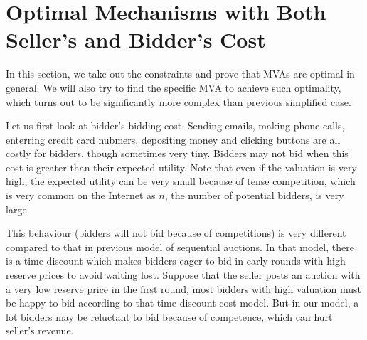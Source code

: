 \section{Optimal Mechanisms with Both Seller's and Bidder's Cost}

In this section, we take out the constraints and prove that MVAs are optimal in
general. We will also try to find the specific MVA to achieve such optimality,
which turns out to be significantly more complex than previous
simplified case.

Let us first look at bidder's bidding cost.  Sending emails, making phone
calls, enterring credit card nubmers, depositing money and clicking buttons are
all costly for bidders, though sometimes very tiny.  Bidders may not bid when
this cost is greater than their expected utility. Note that even if the
valuation is very high, the expected utility can be very small because of tense
competition, which is very common on the Internet as $n$, the number of
potential bidders, is very large.


This behaviour (bidders will not bid because of competitions) is very different
compared to that in previous model \cite{McAfee97:SequentialAuctions} of
sequential auctions. In that model, there is a time discount which
makes bidders eager to bid in early rounds with high reserve prices to avoid
waiting lost. 
Suppose that the seller posts an auction with a very low reserve price in
the first round, most bidders with high valuation must be happy to bid
according to that time discount cost model. But in our model, a lot bidders
may be reluctant to bid because of competence, which can hurt seller's revenue.

